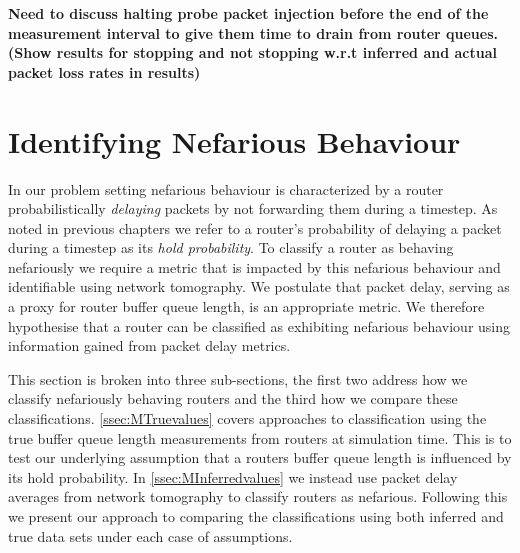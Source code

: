 \textbf{Need to discuss halting probe packet injection before the end of the measurement interval to give them time to drain from router queues. (Show results for stopping and not stopping w.r.t inferred and actual packet loss rates in results)}

\section{Identifying Nefarious Behaviour}
\label{sec:MNefidentification}
  In our problem setting nefarious behaviour is characterized by a router probabilistically \textit{delaying} packets by not forwarding them during a timestep. As noted in previous chapters we refer to a router's probability of delaying a packet during a timestep as its \textit{hold probability}. To classify a router as behaving nefariously we require a metric that is impacted by this nefarious behaviour and identifiable using network tomography. We postulate that packet delay, serving as a proxy for router buffer queue length, is an appropriate metric. We therefore hypothesise that a router can be classified as exhibiting nefarious behaviour using information gained from packet delay metrics.\par
  This section is broken into three sub-sections, the first two address how we classify nefariously behaving routers and the third how we compare these classifications. \cref{ssec:MTruevalues} covers approaches to classification using the true buffer queue length measurements from routers at simulation time. This is to test our underlying assumption that a routers buffer queue length is influenced by its hold probability. In \cref{ssec:MInferredvalues} we instead use packet delay averages from network tomography to classify routers as nefarious. Following this we present our approach to comparing the classifications using both inferred and true data sets under each case of assumptions.
  
